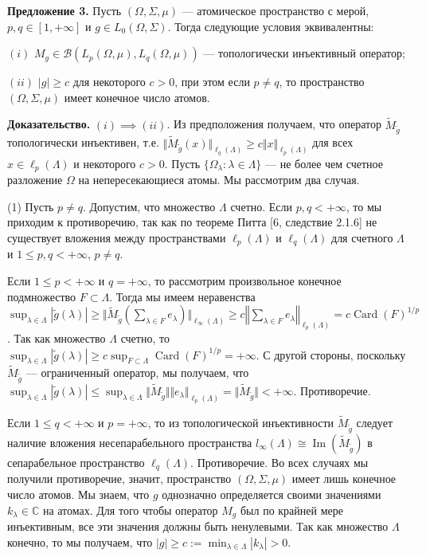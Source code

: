 \documentclass[11pt,twoside]{article}
\begin{document}
\textbf{Предложение 3.} 
Пусть $(\Omega,\Sigma,\mu)$ --- атомическое пространство
с мерой, $p,q\in[1,+\infty]$ и $g\in L_0(\Omega,\Sigma)$. Тогда следующие
условия эквивалентны:

$(i)$ $M_g\in\mathcal{B}(L_p(\Omega,\mu),L_q(\Omega,\mu))$ --- топологически
инъективный оператор;

$(ii)$ $|g|\geq c$ для некоторого $c>0$, при этом если $p\neq q$, то
пространство $(\Omega,\Sigma,\mu)$ имеет конечное число атомов.

\textbf{Доказательство.} $(i)$$\implies$$(ii)$.
Из предположения получаем, что оператор $\widetilde{M}_{\widetilde{g}}$ 
топологически инъективен, т.е. 
$\Vert\widetilde{M}_{\widetilde{g}}(x)\Vert_{\ell_q(\Lambda)}\geq c\Vert
x\Vert_{\ell_p(\Lambda)}$ для всех $x\in\ell_p(\Lambda)$ и некоторого
$c>0$. Пусть $ \{\Omega_\lambda:\lambda\in\Lambda \}$ --- 
не более чем счетное разложение $\Omega$ на непересекающиеся атомы. 
Мы рассмотрим два случая.

(1) Пусть $p\neq q$. Допустим, что множество $\Lambda$ счетно. Если
$p,q<+\infty$, то мы приходим к противоречию, так как по теореме Питта
[6, следствие 2.1.6] не существует вложения между пространствами
$\ell_p(\Lambda)$ и $\ell_q(\Lambda)$ для счетного $\Lambda$ и $1\leq
p,q<+\infty$, $p\neq q$.

Если $1\leq p<+\infty$ и $q=+\infty$, то рассмотрим произвольное
конечное подмножество $F\subset\Lambda$. Тогда мы имеем неравенства 
$\sup_{\lambda\in\Lambda}|\widetilde{g}(\lambda)|
    \geq\Vert\widetilde{M}_{\widetilde{g}}
    \left(
        \sum\nolimits_{\lambda\in F}e_\lambda
    \right)\Vert_{\ell_\infty(\Lambda)} 
    \geq c\left\Vert
        \sum\nolimits_{\lambda\in F}e_\lambda
    \right\Vert_{\ell_p(\Lambda)}
    =c{\operatorname{Card}(F)}^{1/p}$. 
Так как множество $\Lambda$ счетно, то 
$\sup_{\lambda\in\Lambda}|\widetilde{g}(\lambda)|
    \geq c\sup_{F\subset\Lambda}{\operatorname{Card}(F)}^{1/p}=+\infty$. 
С другой стороны, поскольку $\widetilde{M}_{\widetilde{g}}$ --- 
ограниченный оператор, мы получаем, что
$\sup_{\lambda\in\Lambda}|\widetilde{g}(\lambda)|
\leq\sup_{\lambda\in\Lambda}\Vert\widetilde{M}_{\widetilde{g}}\Vert\Vert
e_\lambda\Vert_{\ell_p(\Lambda)}
=\Vert\widetilde{M}_{\widetilde{g}}\Vert<+\infty$. Противоречие.

Если $1\leq q<+\infty$ и $p=+\infty$, то из топологической инъективности
$\widetilde{M}_{\widetilde{g}}$ следует наличие вложения несепарабельного
пространства
$l_\infty(\Lambda)\cong\operatorname{Im}(\widetilde{M}_{\widetilde{g}})$ 
в сепарабельное пространство $\ell_q(\Lambda)$. Противоречие. 
Во всех случаях мы получили противоречие, значит, пространство 
$(\Omega,\Sigma,\mu)$ имеет
лишь конечное число атомов. Мы знаем, что $g$ однозначно определяется своими
значениями $k_\lambda\in\mathbb{C}$ на атомах. Для того чтобы оператор $M_g$
был по крайней мере инъективным, все эти значения должны быть ненулевыми.
Так как множество $\Lambda$ конечно, то мы получаем, что $|g|\geq
c:=\min_{\lambda\in\Lambda}|k_\lambda|>0$.
\end{document}
